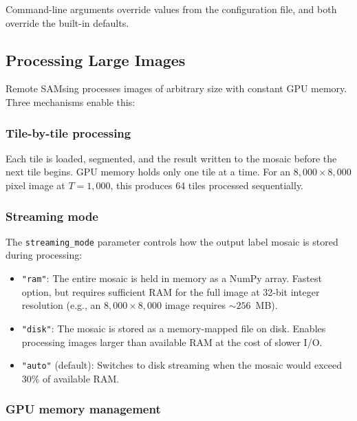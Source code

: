 \documentclass[review,11pt,authoryear]{elsarticle}
\begin{document}
\noindent
Command-line arguments override values from the configuration file, and both override the built-in defaults.


\subsection{Processing Large Images}
\label{sec:large}

Remote SAMsing processes images of arbitrary size with constant GPU memory. Three mechanisms enable this:

\subsubsection{Tile-by-tile processing}

Each tile is loaded, segmented, and the result written to the mosaic before the next tile begins. GPU memory holds only one tile at a time. For an $8{,}000 \times 8{,}000$ pixel image at $T = 1{,}000$, this produces 64 tiles processed sequentially.

\subsubsection{Streaming mode}

The \texttt{streaming\_mode} parameter controls how the output label mosaic is stored during processing:
\begin{itemize}
    \item \texttt{"ram"}: The entire mosaic is held in memory as a NumPy array. Fastest option, but requires sufficient RAM for the full image at 32-bit integer resolution (e.g., an $8{,}000 \times 8{,}000$ image requires ${\sim}256$~MB).
    \item \texttt{"disk"}: The mosaic is stored as a memory-mapped file on disk. Enables processing images larger than available RAM at the cost of slower I/O.
    \item \texttt{"auto"} (default): Switches to disk streaming when the mosaic would exceed 30\% of available RAM.
\end{itemize}

\subsubsection{GPU memory management}
\end{document}
